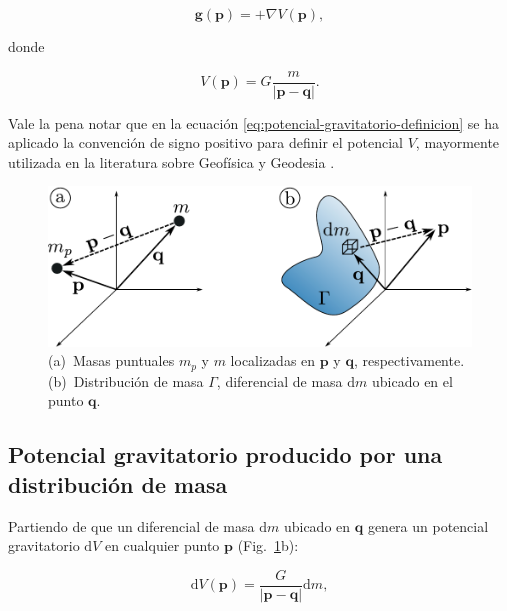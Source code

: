 \begin{equation}
    \mathbf{g}(\mathbf{p}) = + \nabla V(\mathbf{p}),
    \label{eq:potencial-gravitatorio-definicion}
\end{equation}

\noindent donde

\begin{equation}
    V(\mathbf{p}) = G \frac{m}{|\mathbf{p} - \mathbf{q}|}.
    \label{eq:potencial-gravitatorio-particula}
\end{equation}

\noindent Vale la pena notar que en la ecuación
\ref{eq:potencial-gravitatorio-definicion} se ha aplicado la convención de
signo positivo para definir el potencial $V$, mayormente utilizada en la
literatura sobre Geofísica y Geodesia
\citep{heiskanen1967,blakely1995,hinze2009}.

\begin{figure}
    \centering
    \includegraphics[width=\linewidth]{figs/gravity-potentials.pdf}
    \caption{
        (a)~Masas puntuales $m_p$ y $m$ localizadas en $\mathbf{p}$
        y $\mathbf{q}$, respectivamente.
        (b)~Distribución de masa $\Gamma$, diferencial de masa $\text{d}m$
        ubicado en el punto $\mathbf{q}$.
    }
    \label{fig:potencial-gravitatorio}
\end{figure}


\subsection{Potencial gravitatorio producido por una distribución de masa}

Partiendo de que un diferencial de masa $\text{d}m$ ubicado en $\mathbf{q}$
genera un potencial gravitatorio $\text{d}V$ en cualquier punto $\mathbf{p}$
(Fig.~\ref{fig:potencial-gravitatorio}b):

\begin{equation}
    \text{d}V(\mathbf{p}) = \frac{G}{|\mathbf{p} - \mathbf{q}|} \text{d}m,
\end{equation}


